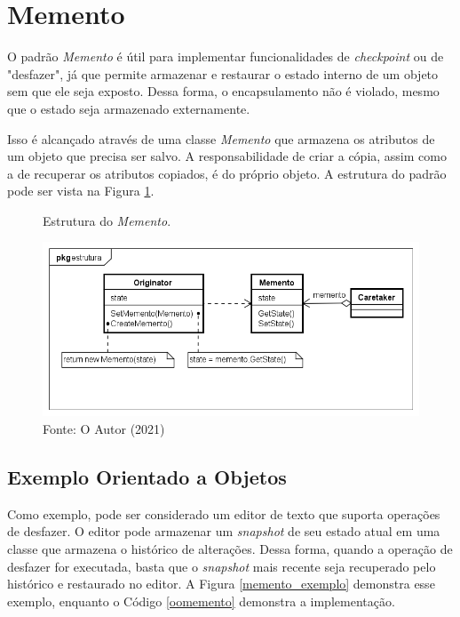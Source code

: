 \section{Memento}

O padrão \textit{Memento} é útil para implementar funcionalidades 
de \textit{checkpoint} ou de "desfazer", já que permite 
armazenar e restaurar o estado interno de um objeto 
sem que ele seja exposto. Dessa forma, o encapsulamento 
não é violado, mesmo que o estado seja armazenado externamente.
\cite{gamma:1995}

Isso é alcançado através de uma classe \textit{Memento} que armazena os 
atributos de um objeto que precisa ser salvo. A responsabilidade 
de criar a cópia, assim como a de recuperar os atributos copiados, 
é do próprio objeto. A estrutura do padrão pode ser vista 
na Figura \ref{memento_struct}.

\begin{figure}[htb]
	\caption{\label{memento_struct}Estrutura do \textit{Memento}.}
	\begin{center}
	    \includegraphics[scale=0.5]{5_padroes-contexto-funcional/5.3_comportamentais/5.3.06_memento/memento_estrutura.png}
	\end{center}
  \caption*{Fonte: O Autor (2021)}
\end{figure}

\subsection*{Exemplo Orientado a Objetos}

Como exemplo, pode ser considerado um editor de texto que 
suporta operações de desfazer. O editor pode armazenar um 
\textit{snapshot} de seu estado atual em uma classe que 
armazena o histórico de alterações. Dessa forma, quando a 
operação de desfazer for executada, basta que o 
\textit{snapshot} mais recente seja recuperado pelo histórico 
e restaurado no editor. A Figura \ref{memento_exemplo} demonstra 
esse exemplo, enquanto o Código \ref{oomemento} demonstra a 
implementação.

